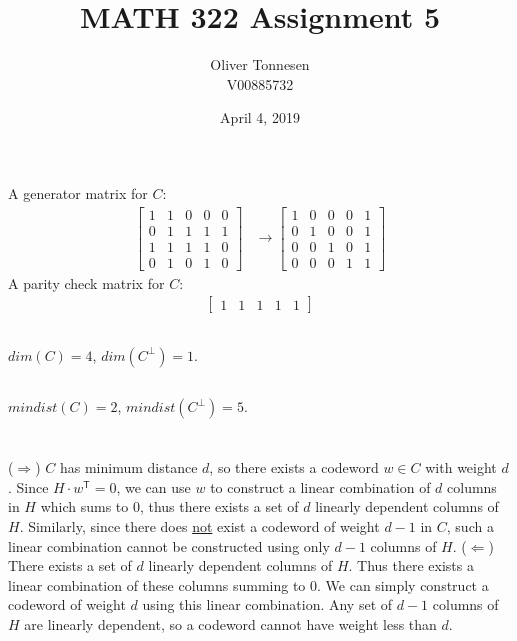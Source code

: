 \documentclass{article}
\title{MATH 322 Assignment 5}
\author{Oliver Tonnesen\\V00885732}
\date{April 4, 2019}
\begin{document}
\maketitle
\renewcommand{\thesubsection}{\thesection.\alph{subsection}}
\section{} %
\subsection{} %
A generator matrix for $C$:
\begin{align*}
\begin{bmatrix}
	1 & 1 & 0 & 0 & 0\\
	0 & 1 & 1 & 1 & 1\\
	1 & 1 & 1 & 1 & 0\\
	0 & 1 & 0 & 1 & 0
\end{bmatrix}
&\longrightarrow
\begin{bmatrix}
	1 & 0 & 0 & 0 & 1\\
	0 & 1 & 0 & 0 & 1\\
	0 & 0 & 1 & 0 & 1\\
	0 & 0 & 0 & 1 & 1
\end{bmatrix}
\end{align*}
A parity check matrix for $C$:
\begin{align*}
	\begin{bmatrix}
		1 & 1 & 1 & 1 & 1
	\end{bmatrix}
\end{align*}
\subsection{} %
$dim(C)=4$, $dim(C^\perp)=1$.
\subsection{} %
$min dist(C)=2$, $min dist(C^\perp)=5$.

\section{} %
($\Longrightarrow$) $C$ has minimum distance $d$, so there exists a codeword
$w\in C$ with weight $d$. Since $H\cdot w^\mathsf{T}=0$, we can use $w$ to
construct a linear combination of $d$ columns in $H$ which sums to 0, thus
there exists a set of $d$ linearly dependent columns of $H$. Similarly, since
there does \underline{not} exist a codeword of weight $d-1$ in $C$, such a
linear combination cannot be constructed using only $d-1$ columns of $H$.
\newline
\newline
($\Longleftarrow$) There exists a set of $d$ linearly dependent columns of $H$.
Thus there exists a linear combination of these columns summing to 0. We can
simply construct a codeword of weight $d$ using this linear combination. Any
set of $d-1$ columns of $H$ are linearly dependent, so a codeword cannot have
weight less than $d$.
\end{document}
